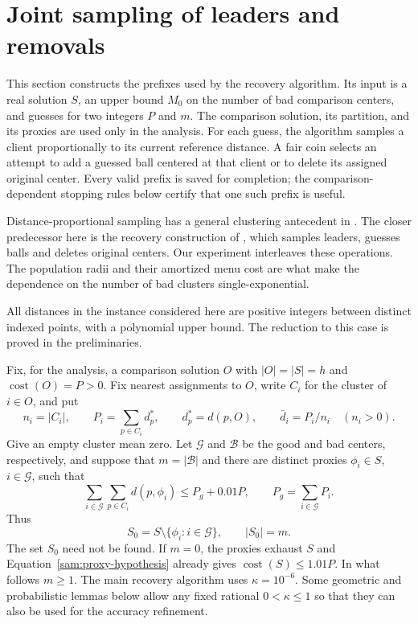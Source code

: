 \section{Joint sampling of leaders and removals}
\label{sam:section}

This section constructs the prefixes used by the recovery algorithm.  Its
input is a real solution $S$, an upper bound $M_0$ on the number of bad
comparison centers, and guesses for two integers $P$ and $m$.  The comparison
solution, its partition, and its proxies are used only in the analysis.
For each guess, the algorithm samples a client proportionally to its current
reference distance. A fair coin selects an attempt to add a guessed ball
centered at that client or to delete its assigned original center.
Every valid prefix is saved for completion; the comparison-dependent
stopping rules below certify that one such prefix is useful.

Distance-proportional sampling has a general clustering antecedent in
\cite[Section~5]{ArthurVassilvitskii2007}.  The closer predecessor here
is the recovery construction of \cite[Sections~4.2--4.4]{CGLSS2026},
which samples leaders, guesses balls and deletes original centers.
Our experiment interleaves these operations.  The population radii and
their amortized menu cost are what make the dependence on the number
of bad clusters single-exponential.

All distances in the instance considered here are positive integers between
distinct indexed points, with a polynomial upper bound.  The reduction to
this case is proved in the preliminaries.

Fix, for the analysis, a comparison solution $O$ with
$|O|=|S|=h$ and $\operatorname{cost}(O)=P>0$.  Fix nearest assignments to $O$,
write $C_i$ for the cluster of $i\in O$, and put
\[
 n_i=|C_i|,\qquad P_i=\sum_{p\in C_i}d_p^*,\qquad
 d_p^*=d(p,O),\qquad
 \bar d_i=P_i/n_i\quad(n_i>0).
\]
Give an empty cluster mean zero.  Let $\mathcal G$ and $\mathcal B$ be the
good and bad centers, respectively, and suppose that $m=|\mathcal B|$ and
there are distinct proxies $\phi_i\in S$, $i\in\mathcal G$, such that
\begin{equation}
 \sum_{i\in\mathcal G}\sum_{p\in C_i}d(p,\phi_i)
 \le P_g+0.01P,
 \qquad P_g=\sum_{i\in\mathcal G}P_i.
 \label{sam:proxy-hypothesis}
\end{equation}
Thus
\begin{equation}
 S_0=S\setminus\{\phi_i:i\in\mathcal G\},\qquad |S_0|=m.
 \label{sam:nonproxy-set}
\end{equation}
The set $S_0$ need not be found.  If $m=0$, the proxies exhaust $S$ and
Equation~\eqref{sam:proxy-hypothesis} already gives
$\operatorname{cost}(S)\le1.01P$.  In what follows $m\ge1$.
The main recovery algorithm uses $\kappa=10^{-6}$.  Some geometric and
probabilistic lemmas below allow any fixed rational $0<\kappa\le1$ so that
they can also be used for the accuracy refinement.

